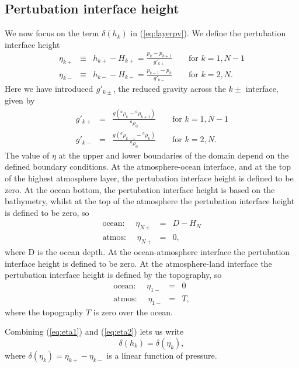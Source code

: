 \documentclass[11pt, a4paper,twoside]{article}
\newcommand{\rhb}[1]{{{}^{#1}\rho}}
\newcommand{\gp}[2]{{}^{#1}g'_{#2}}
\numberwithin{equation}{section}
\begin{document}
\subsection{Pertubation interface height}
We now focus on the term $\delta(h_k)$ in (\ref{eq:layerpv}). We define the pertubation interface height
\begin{eqnarray}
\eta_{k+} & \equiv & h_{k+} - H_{k+} = \frac{p_k - p_{k+1}}{\gp{}{k+}} \quad \quad \textrm{for } k=1,N-1\label{eq:eta1}\\
\eta_{k-} & \equiv & h_{k-} - H_{k-} = \frac{p_{k-1} - p_{k}}{\gp{}{k-}}  \quad \quad \textrm{for } k=2,N.\label{eq:eta2}
\end{eqnarray}
Here we have introduced $\gp{}{k\pm}$, the reduced gravity across the $k\pm$ interface, given by
\begin{eqnarray}
\gp{}{k+} & = & \frac{g(\rhb{a}_k - \rhb{a}_{k+1})}{\rhb{a}_0} \quad \quad \textrm{for } k=1,N-1\\
\gp{}{k-} & = & \frac{g(\rhb{a}_{k-1} - \rhb{a}_{k})}{\rhb{a}_0} \quad \quad \textrm{for } k=2,N.
\end{eqnarray}
The value of $\eta$ at the upper and lower boundaries of the domain depend on the defined boundary conditions.
At the atmosphere-ocean interface, and at the top of the highest atmosphere layer, the pertubation interface height is defined to be zero.
At the ocean bottom, the pertubation interface height is based on the bathymetry, whilst at the top of the atmosphere the pertubation interface height is defined to be zero, so
\begin{eqnarray}
\textrm{ocean: } \quad \eta_{N+} & = & D - H_N \\
\textrm{atmos: } \quad \eta_{N+} & = & 0,
\end{eqnarray}
where D is the ocean depth.
At the ocean-atmosphere interface the pertubation interface height is defined to be zero. At the atmosphere-land interface the pertubation interface height is defined by the topography, so
\begin{eqnarray}
\textrm{ocean: } \quad \eta_{1-} & = & 0 \\
\textrm{atmos: } \quad \eta_{1-} & = & T,
\end{eqnarray}
where the topography $T$ is zero over the ocean.

Combining (\ref{eq:eta1}) and (\ref{eq:eta2}) lets us write
\begin{equation}
\delta(h_k) = \delta(\eta_k),
\end{equation}
where $\delta(\eta_k) = \eta_{k+} - \eta_{k-}$ is a linear function of pressure.
\end{document}
